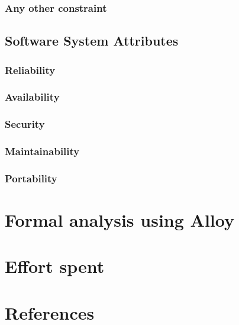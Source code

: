 \documentclass{article}
\begin{document}
            \subsubsection{Any other constraint}
        \subsection{Software System Attributes}
                \subsubsection{Reliability}
                \subsubsection{Availability}
                \subsubsection{Security}
                \subsubsection{Maintainability}
                \subsubsection{Portability}
                
    \section{Formal analysis using Alloy}
    
    \section{Effort spent}
    
    \section{References}
\end{document}
